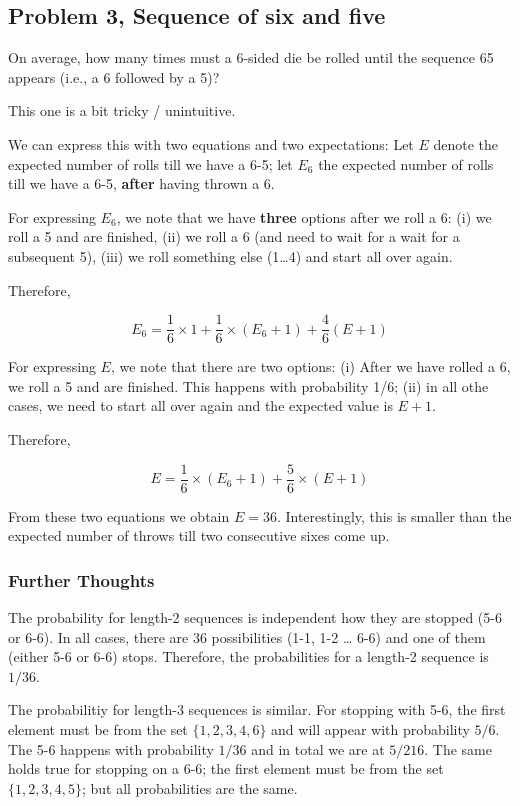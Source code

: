 \subsection{Problem 3, Sequence of six and five}

On average, how many times must a 6-sided die be rolled until the
sequence 65 appears (i.e., a 6 followed by a 5)?

This one is a bit tricky / unintuitive.

We can express this with two equations and two expectations: Let \(E\)
denote the expected number of rolls till we have a 6-5; let \(E_6\) the
expected number of rolls till we have a 6-5, \textbf{after} having
thrown a 6.

For expressing \(E_6\), we note that we have \textbf{three} options
after we roll a 6: (i) we roll a 5 and are finished, (ii) we roll a 6
(and need to wait for a wait for a subsequent 5), (iii) we roll
something else (1\ldots{}4) and start all over again.

Therefore,

\[
E_6 = \frac{1}{6} \times 1 + \frac{1}{6} \times (E_6 + 1) + \frac{4}{6} (E+1)
\]

For expressing \(E\), we note that there are two options: (i) After we
have rolled a 6, we roll a 5 and are finished. This happens with
probability 1/6; (ii) in all othe cases, we need to start all over again
and the expected value is \(E+1\).

Therefore,

\[
E = \frac{1}{6} \times (E_6 + 1) + \frac{5}{6} \times (E+1)
\]

From these two equations we obtain \(E = 36\). Interestingly, this is
smaller than the expected number of throws till two consecutive sixes
come up.

\subsubsection{Further Thoughts}

The probability for length-2 sequences is independent how they are
stopped (5-6 or 6-6). In all cases, there are 36 possibilities (1-1, 1-2
\ldots{} 6-6) and one of them (either 5-6 or 6-6) stops. Therefore, the
probabilities for a length-2 sequence is \(1/36\).

The probabilitiy for length-3 sequences is similar. For stopping with
5-6, the first element must be from the set \(\{1,2,3,4,6\}\) and will
appear with probability \(5/6\). The 5-6 happens with probability
\(1/36\) and in total we are at \(5/216\). The same holds true for
stopping on a 6-6; the first element must be from the set
\(\{1,2,3,4,5\}\); but all probabilities are the same.

